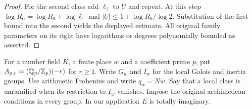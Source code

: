 \documentclass[a4paper,11pt]{article}
\theoremstyle{definition}
\theoremstyle{remark}
\newcommand{\ZZ}{\mathbb Z}\newcommand{\ord}{\operatorname{ord}}
\numberwithin{equation}{section}
\begin{document}
\begin{proof}
For the second class add \(\ell_1\) to \(U\) and repeat.
At this step \(\log R_U=\log R_0+\log\ell_1\) and
\(|U|\le1+\log R_0/\log2\). Substitution of the first
bound into the second yields the displayed estimate. All
original family parameters on its right have logarithms
or degrees polynomially bounded as asserted.
\end{proof}

For a number field \(K\), a finite place \(w\) and a
coefficient prime \(p\), put
\(A_{p,r}=(\QQ_p/\ZZ_p)(-r)\) for \(r\ge1\). Write
\(G_w\) and \(I_w\) for the local Galois and inertia groups.
Use arithmetic Frobenius and write \(q_w=Nw\). Say that a
local class is unramified when its restriction to \(I_w\)
vanishes. Impose the original archimedean conditions in
every group. In our application \(E\) is totally imaginary.
\end{document}
